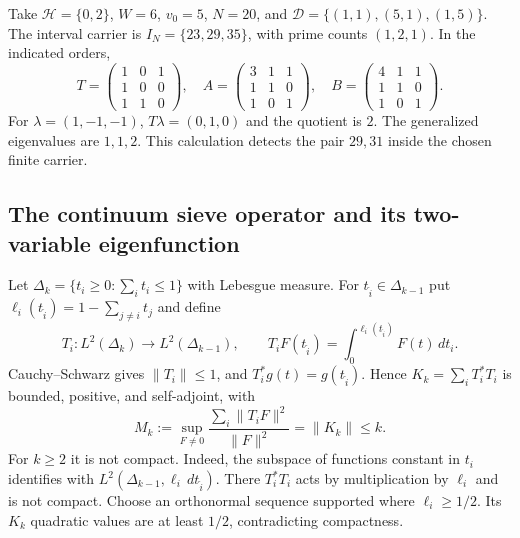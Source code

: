 \begin{example}
Take $\mathcal H=\{0,2\}$, $W=6$, $v_0=5$, $N=20$, and
$\mathcal D=\{(1,1),(5,1),(1,5)\}$.
The interval carrier is $I_N=\{23,29,35\}$, with prime counts $(1,2,1)$.
In the indicated orders,
\[
 T=\begin{pmatrix}1&0&1\\1&0&0\\1&1&0\end{pmatrix},\quad
 A=\begin{pmatrix}3&1&1\\1&1&0\\1&0&1\end{pmatrix},\quad
 B=\begin{pmatrix}4&1&1\\1&1&0\\1&0&1\end{pmatrix}.
\]
For $\lambda=(1,-1,-1)$, $T\lambda=(0,1,0)$ and the quotient is $2$.
The generalized eigenvalues are $1,1,2$.
This calculation detects the pair $29,31$ inside the chosen finite carrier.
\end{example}

\subsection{The continuum sieve operator and its two-variable eigenfunction}
\label{syn-arith:continuum-sieve}

Let $\Delta_k=\{t_i\geq0:\sum_it_i\leq1\}$ with Lebesgue measure.
For $t_{\widehat i}\in\Delta_{k-1}$ put
$\ell_i(t_{\widehat i})=1-\sum_{j\ne i}t_j$ and define
\[
 T_i:L^2(\Delta_k)\longrightarrow L^2(\Delta_{k-1}),\qquad
 T_iF(t_{\widehat i})=\int_0^{\ell_i(t_{\widehat i})}F(t)\,dt_i.
\]
Cauchy--Schwarz gives $\|T_i\|\leq1$, and
$T_i^*g(t)=g(t_{\widehat i})$.
Hence $K_k=\sum_iT_i^*T_i$ is bounded, positive, and self-adjoint, with
\[
 M_k:=\sup_{F\ne0}\frac{\sum_i\|T_iF\|^2}{\|F\|^2}
     =\|K_k\|\leq k.
\]
For $k\geq2$ it is not compact.
Indeed, the subspace of functions constant in $t_i$ identifies with
$L^2(\Delta_{k-1},\ell_i\,dt_{\widehat i})$.
There $T_i^*T_i$ acts by multiplication by $\ell_i$ and is not compact.
Choose an orthonormal sequence supported where $\ell_i\geq1/2$.
Its $K_k$ quadratic values are at least $1/2$, contradicting compactness.

